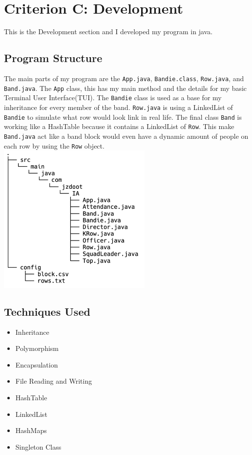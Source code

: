 \documentclass{article}
\begin{document}
\section{Criterion C: Development}
This is the Development section and I developed my program in java\cite{java17}.
\subsection{Program Structure}
The main parts of my program are the \verb|App.java|, \verb|Bandie.class|, \verb|Row.java|, and \verb|Band.java|. The \verb|App| class, this has my main method and the details for my basic Terminal User Interface(TUI). The \verb|Bandie| class is used as a base for my inheritance for every member of the band. \verb|Row.java| is using a LinkedList\cite{linkedList} of \verb|Bandie| to simulate what row would look link in real life. The final class \verb|Band| is working like a HashTable\cite{hashTable} because it contains a LinkedList of \verb|Row|. This make \verb|Band.java| act like a band block would even have a dynamic amount of people on each row by using the \verb|Row| object.\\
\includegraphics[width=3in]{fileStructure.png}
\subsection{Techniques Used}
\begin{itemize}
	\item Inheritance
	\item Polymorphism
	\item Encapsulation
	\item File Reading and Writing
	\item HashTable\cite{hashTable}
	\item LinkedList\cite{linkedList}
	\item HashMaps\cite{hashMap}
	\item Singleton Class
\end{itemize}
\end{document}
